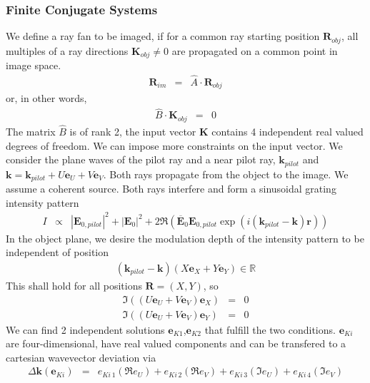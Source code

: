 \documentclass[12pt,a4paper,twoside,openright,BCOR10mm,headsepline,titlepage,abstracton,chapterprefix,final]{scrreprt}
\newcommand\Vector[1]{{\mathbf{#1}}}
\newcommand\Location{\Vector{r}}
\newcommand\wavenumber{k}
\newcommand\Wavevector{\Vector{\wavenumber}}
\newcommand\scalarEfield{E}
\newcommand\Efield{\Vector{\scalarEfield}}
\begin{document}
\subsubsection{Finite Conjugate Systems}
We define a ray fan to be imaged, 
if for a common ray starting position $\Vector{R}_{obj}$, all multiples of a
ray directions $\Vector{K}_{obj} \neq 0$ are propagated on a common point in image space.
\begin{eqnarray}
 \Vector{R}_{im} &=& \hat{A} \cdot \Vector{R}_{obj}
\end{eqnarray}
or, in other words,
\begin{eqnarray}
 \hat{B} \cdot \Vector{K}_{obj} &=& 0
\end{eqnarray}
The matrix $\hat{B}$ is of rank 2, the input vector $\Vector{K}$ contains 4 independent real valued degrees of freedom.
We can impose more constraints on the input vector. 
We consider the plane waves of the pilot ray and a near pilot ray, 
$\Wavevector_{pilot}$ and $\Wavevector = \Wavevector_{pilot} + U \Vector{e}_U + V \Vector{e}_V$.
Both rays propagate from the object to the image.
We assume a coherent source.
Both rays interfere and form a sinusoidal grating intensity pattern
\begin{eqnarray}
 I &\propto& |\Efield_{0,pilot}|^2 + |\Efield_{0}|^2 + 2 \Re \left( \overline{\Efield}_{0}\Efield_{0,pilot} \exp(i(\Wavevector_{pilot} - \Wavevector)\Location) \right)
\end{eqnarray}
In the object plane, we desire the modulation depth of the intensity pattern to be independent of position
\begin{eqnarray}
 (\Wavevector_{pilot} - \Wavevector)(X \Vector{e}_X + Y \Vector{e}_Y) \in \mathbb{R} \label{eq:xyuvRealGratingConstraint}
\end{eqnarray}
This shall hold for all positions $\Vector{R}=(X,Y)$, so
\begin{eqnarray}
 \Im ( (U \Vector{e}_U + V \Vector{e}_V) \Vector{e}_X ) &=& 0 \\
 \Im ( (U \Vector{e}_U + V \Vector{e}_V) \Vector{e}_Y ) &=& 0
\end{eqnarray}
We can find 2 independent solutions $\Vector{e}_{K1}$,$\Vector{e}_{K2}$ that fulfill the two conditions.
$\Vector{e}_{Ki}$ are four-dimensional, have real valued components and can be transfered to a cartesian wavevector deviation via
\begin{eqnarray}
 \Delta \Wavevector(\Vector{e}_{Ki}) &=& e_{Ki\,1} (\Re e_{U}) + e_{Ki\,2} (\Re e_{V}) + e_{Ki\,3} (\Im e_{U}) + e_{Ki\,4} (\Im e_{V})
\end{eqnarray}
\end{document}
